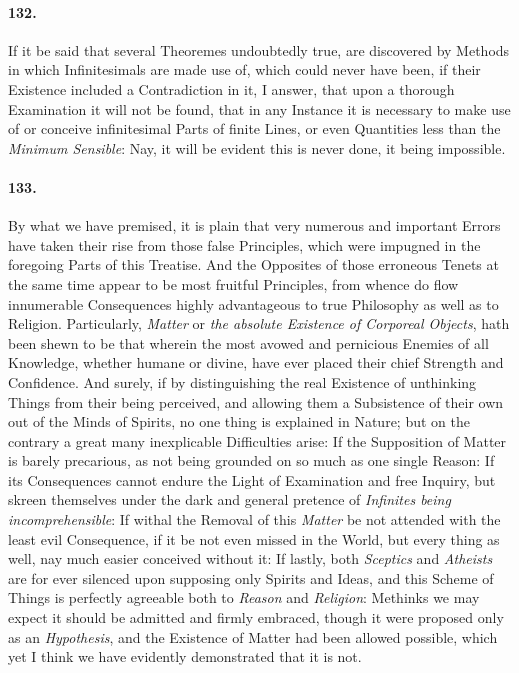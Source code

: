 \documentclass[]{article}
\newenvironment{sectionbody}{}{}
\begin{document}
\begin{sectionbody}
\paragraph{132.} If it be said that several Theoremes undoubtedly true, are
discovered by Methods in which Infinitesimals are made use of,
which could never have been, if their Existence included a
Contradiction in it, I answer, that upon a thorough Examination
it will not be found, that in any Instance it is necessary to
make use of or conceive infinitesimal Parts of finite Lines, or
even Quantities less than the \emph{Minimum Sensible}: Nay, it
will be evident this is never done, it being impossible.



\paragraph{133.} By what we have premised, it is plain that very numerous and
important Errors have taken their rise from those false
Principles, which were impugned in the foregoing Parts of this
Treatise.  And the Opposites of those erroneous Tenets at the
same time appear to be most fruitful Principles, from whence do
flow innumerable Consequences highly advantageous to true
Philosophy as well as to Religion.  Particularly, \emph{Matter}
or \emph{the absolute Existence of Corporeal Objects}, hath been
shewn to be that wherein the most avowed and pernicious Enemies
of all Knowledge, whether humane or divine, have ever placed
their chief Strength and Confidence.  And surely, if by
distinguishing the real Existence of unthinking Things from their
being perceived, and allowing them a Subsistence of their own out
of the Minds of Spirits, no one thing is explained in Nature; but
on the contrary a great many inexplicable Difficulties arise: If
the Supposition of Matter is barely precarious, as not being
grounded on so much as one single Reason: If its Consequences
cannot endure the Light of Examination and free Inquiry, but
skreen themselves under the dark and general pretence of
\emph{Infinites being incomprehensible}: If withal the Removal
of this \emph{Matter} be not attended with the least evil
Consequence, if it be not even missed in the World, but every
thing as well, nay much easier conceived without it: If lastly,
both \emph{Sceptics} and \emph{Atheists} are for ever silenced
upon supposing only Spirits and Ideas, and this Scheme of Things
is perfectly agreeable both to \emph{Reason} and
\emph{Religion}: Methinks we may expect it should be admitted
and firmly embraced, though it were proposed only as an
\emph{Hypothesis}, and the Existence of Matter had been allowed
possible, which yet I think we have evidently demonstrated that
it is not.




\end{sectionbody}
\end{document}
